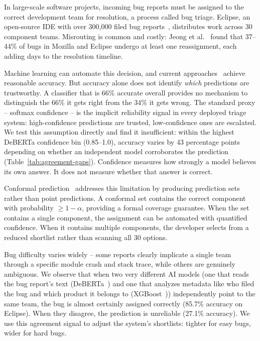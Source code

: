 \documentclass[conference]{IEEEtran}
\begin{document}
In large-scale software projects, incoming bug reports must be assigned to the correct development team for resolution, a process called bug triage. Eclipse, an open-source IDE with over 300{,}000 filed bug reports~\cite{lamkanfi2013eclipse}, distributes work across 30 component teams. Misrouting is common and costly: Jeong et al.~\cite{jeong2009improving} found that 37--44\% of bugs in Mozilla and Eclipse undergo at least one reassignment, each adding days to the resolution timeline.

Machine learning can automate this decision, and current approaches~\cite{anvik2006should,xia2017elm,dipongkor2023transformer,chen2025triangle,xu2026whatscode} achieve reasonable accuracy. But accuracy alone does not identify \emph{which} predictions are trustworthy. A classifier that is 66\% accurate overall provides no mechanism to distinguish the 66\% it gets right from the 34\% it gets wrong. The standard proxy -- softmax confidence -- is the implicit reliability signal in every deployed triage system: high-confidence predictions are trusted, low-confidence ones are escalated. We test this assumption directly and find it insufficient: within the highest DeBERTa confidence bin (0.85--1.0), accuracy varies by 43 percentage points depending on whether an independent model corroborates the prediction (Table~\ref{tab:agreement-gaps}). Confidence measures how strongly a model believes its own answer. It does not measure whether that answer is correct.

Conformal prediction~\cite{vovk2005algorithmic} addresses this limitation by producing prediction sets rather than point predictions. A conformal set contains the correct component with probability $\geq 1 - \alpha$, providing a formal coverage guarantee. When the set contains a single component, the assignment can be automated with quantified confidence. When it contains multiple components, the developer selects from a reduced shortlist rather than scanning all 30 options.

Bug difficulty varies widely -- some reports clearly implicate a single team through a specific module crash and stack trace, while others are genuinely ambiguous. We observe that when two very different AI models (one that reads the bug report's text (DeBERTa~\cite{he2021deberta}) and one that analyzes metadata like who filed the bug and which product it belongs to (XGBoost~\cite{chen2016xgboost})) independently point to the same team, the bug is almost certainly assigned correctly (85.7\% accuracy on Eclipse). When they disagree, the prediction is unreliable (27.1\% accuracy). We use this agreement signal to adjust the system's shortlists: tighter for easy bugs, wider for hard bugs.
\end{document}
